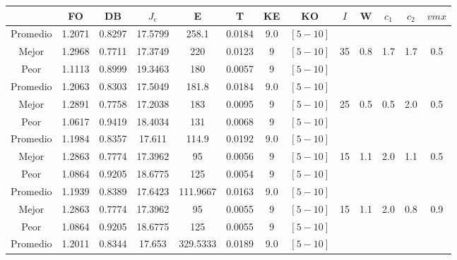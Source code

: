 \begin{table}[h!]
    \footnotesize
    \begin{center}
        \begin{tabular}{|c|c|c|c|c|c|c|c|c|c|c|c|c|}
        \hline
            & {\bf FO} & {\bf DB} & $J_e$ & {\bf E} & {\bf T} & {\bf KE} & {\bf KO} & $I$ & W & $c_1$ & $c_2$ & $vmx$ \\
        \hline
        \hline
            Promedio  & 1.2071 & 0.8297 & 17.5799 & 258.1 & 0.0184 & 9.0 & $[5-10]$ &  &  &  &  & \\
            \cline{1-8}
            Mejor & 1.2968 & 0.7711  & 17.3749 & 220 & 0.0123 & 9 & $[5-10]$ & 35 & 0.8 & 1.7 & 1.7 & 0.5\\
            \cline{1-8}
            Peor & 1.1113 & 0.8999  & 19.3463 & 180 & 0.0057 & 9 & $[5-10]$ &  &  &  &  & \\
        \hline
        \hline
            Promedio  & 1.2063 & 0.8303 & 17.5049 & 181.8 & 0.0184 & 9.0 & $[5-10]$ &  &  &  &  & \\
            \cline{1-8}
            Mejor & 1.2891 & 0.7758  & 17.2038 & 183 & 0.0095 & 9 & $[5-10]$ & 25 & 0.5 & 0.5 & 2.0 & 0.5\\
            \cline{1-8}
            Peor & 1.0617 & 0.9419  & 18.4034 & 131 & 0.0068 & 9 & $[5-10]$ &  &  &  &  & \\
        \hline
        \hline
            Promedio  & 1.1984 & 0.8357 & 17.611 & 114.9 & 0.0192 & 9.0 & $[5-10]$ &  &  &  &  & \\
            \cline{1-8}
            Mejor & 1.2863 & 0.7774  & 17.3962 & 95 & 0.0056 & 9 & $[5-10]$ & 15 & 1.1 & 2.0 & 1.1 & 0.5\\
            \cline{1-8}
            Peor & 1.0864 & 0.9205  & 18.6775 & 125 & 0.0054 & 9 & $[5-10]$ &  &  &  &  & \\
        \hline
        \hline
            Promedio  & 1.1939 & 0.8389 & 17.6423 & 111.9667 & 0.0163 & 9.0 & $[5-10]$ &  &  &  &  & \\
            \cline{1-8}
            Mejor & 1.2863 & 0.7774  & 17.3962 & 95 & 0.0055 & 9 & $[5-10]$ & 15 & 1.1 & 2.0 & 0.8 & 0.9\\
            \cline{1-8}
            Peor & 1.0864 & 0.9205  & 18.6775 & 125 & 0.0055 & 9 & $[5-10]$ &  &  &  &  & \\
        \hline
        \hline
            Promedio  & 1.2011 & 0.8344 & 17.653 & 329.5333 & 0.0189 & 9.0 & $[5-10]$ &  &  &  &  & \\
            \cline{1-8}

\end{tabular}
\end{center}
\end{table}
